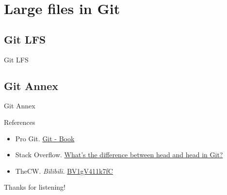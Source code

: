 \documentclass[aspectratio=169]{beamer}
\begin{document}
\section{Large files in Git}

\subsection{Git LFS}

\begin{frame}{Git LFS}
    
\end{frame}

\subsection{Git Annex}

\begin{frame}{Git Annex}
    
\end{frame}

\begin{frame}{References}
    \begin{itemize}
        \item Pro Git. \href{https://git-scm.com/book/en/v2}{Git - Book}
        \item Stack Overflow. \href{https://stackoverflow.com/questions/2221658/whats-the-difference-between-head-and-head-in-git}{What's the difference between head and head in Git?}
        \item TheCW. \emph{Bilibili}. \href{https://www.bilibili.com/video/BV1gV411k7fC}{BV1gV411k7fC}
    \end{itemize}
\end{frame}

\begin{frame}
    \Huge{\textcolor{UMBlue}{Thanks for listening!}}
\end{frame}
\end{document}
